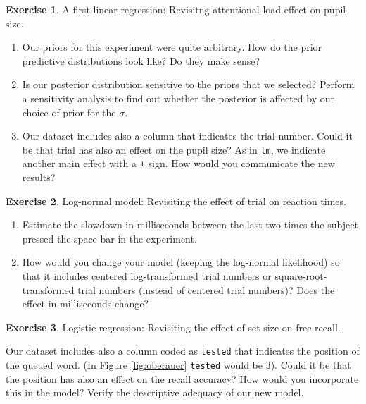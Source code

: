 \documentclass[12pt,]{krantz}
\providecommand{\tightlist}{%
  \setlength{\itemsep}{0pt}\setlength{\parskip}{0pt}}
\theoremstyle{definition}
\theoremstyle{definition}
\theoremstyle{definition}
\newtheorem{exercise}{Exercise}[chapter]
\theoremstyle{remark}
\begin{document}
\begin{exercise}
\protect\hypertarget{exr:pupils}{}{\label{exr:pupils} }A first linear
regression: Revisitng attentional load effect on pupil size.
\end{exercise}

\begin{enumerate}
\def\labelenumi{\alph{enumi}.}
\tightlist
\item
  Our priors for this experiment were quite arbitrary. How do the prior
  predictive distributions look like? Do they make sense?
\item
  Is our posterior distribution sensitive to the priors that we
  selected? Perform a sensitivity analysis to find out whether the
  posterior is affected by our choice of prior for the \(\sigma\).
\item
  Our dataset includes also a column that indicates the trial number.
  Could it be that trial has also an effect on the pupil size? As in
  \texttt{lm}, we indicate another main effect with a \texttt{+} sign.
  How would you communicate the new results?
\end{enumerate}

\begin{exercise}
\protect\hypertarget{exr:lognormalm}{}{\label{exr:lognormalm} }Log-normal
model: Revisiting the effect of trial on reaction times.
\end{exercise}

\begin{enumerate}
\def\labelenumi{\alph{enumi}.}
\tightlist
\item
  Estimate the slowdown in milliseconds between the last two times the
  subject pressed the space bar in the experiment.
\item
  How would you change your model (keeping the log-normal likelihood) so
  that it includes centered log-transformed trial numbers or
  square-root-transformed trial numbers (instead of centered trial
  numbers)? Does the effect in milliseconds change?
\end{enumerate}

\begin{exercise}
\protect\hypertarget{exr:reg-logistic}{}{\label{exr:reg-logistic} }Logistic
regression: Revisiting the effect of set size on free recall.
\end{exercise}

Our dataset includes also a column coded as \texttt{tested} that
indicates the position of the queued word. (In Figure \ref{fig:oberauer}
\texttt{tested} would be 3). Could it be that the position has also an
effect on the recall accuracy? How would you incorporate this in the
model? Verify the descriptive adequacy of our new model.
\end{document}
